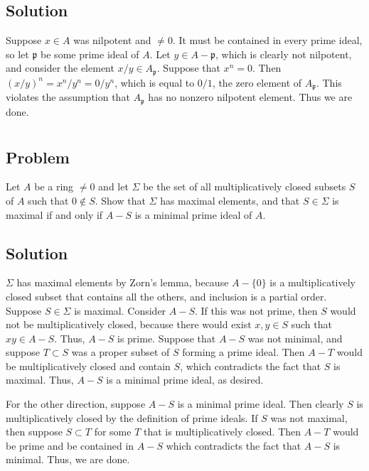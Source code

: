 \documentclass[book,12pt,oneside,openany]{memoir}
\begin{document}
\subsection{Solution}

Suppose $x \in A$ was nilpotent and $\neq 0$. It must be contained in every prime ideal, so let $\mathfrak{p}$ be some prime ideal of $A$. Let $y \in A - \mathfrak{p}$, which is clearly not nilpotent, and consider the element $x/y \in A_{\mathfrak{p}}$. Suppose that $x^n = 0$. Then $(x/y)^n = x^n/y^n = 0/y^n$, which is equal to $0/1$, the zero element of $A_{\mathfrak{p}}$. This violates the assumption that $A_{\mathfrak{p}}$ has no nonzero nilpotent element. Thus we are done.

\section{}
\subsection{Problem}
Let $A$ be a ring $\neq 0$ and let $\Sigma$ be the set of all multiplicatively closed subsets $S$ of $A$ such that $0 \notin S$. Show that $\Sigma$ has maximal elements, and that $S \in \Sigma$ is maximal if and only if $A -S$ is a minimal prime ideal of $A$.
\subsection{Solution}
$\Sigma$ has maximal elements by Zorn's lemma, because $A - \{0\}$ is a multiplicatively closed subset that contains all the others, and inclusion is a partial order. Suppose $S \in \Sigma$ is maximal. Consider $A - S$. If this was not prime, then $S$ would not be multiplicatively closed, because there would exist $x,y \in S$ such that $xy \in A - S$. Thus, $A-S$ is prime. Suppose that $A - S$ was not minimal, and suppose $T \subset S$ was a proper subset of $S$ forming a prime ideal. Then $A - T$ would be multiplicatively closed and contain $S$, which contradicts the fact that $S$ is maximal. Thus, $A-S$ is a minimal prime ideal, as desired.

For the other direction, suppose $A-S$ is a minimal prime ideal. Then clearly $S$ is multiplicatively closed by the definition of prime ideals. If $S$ was not maximal, then suppose $S \subset T$ for some $T$ that is multiplicatively closed. Then $A - T$ would be prime and be contained in $A - S$ which contradicts the fact that $A-S$ is minimal. Thus, we are done.
\end{document}

